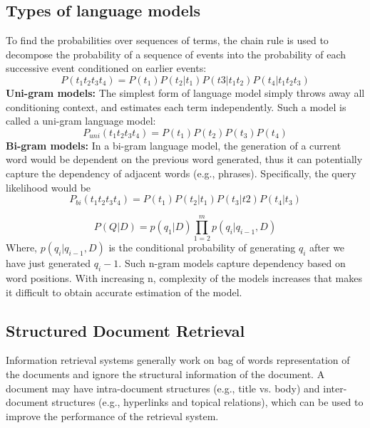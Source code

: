 \documentclass[draftcls, onecolumn, 11pt]{IEEEtran}
\begin{document}
\subsection{Types of language models}
To find the probabilities over sequences of terms, the chain rule is used to decompose the probability of a sequence of events into the probability of each successive event conditioned on earlier events:
\begin{equation}
P(t_1 t_2 t_3 t_4)=P(t_1) P(t_2|t_1) P(t3|t_1 t_2) P(t_4|t_1 t_2 t_3)
\end{equation}
\vspace{8pt}
\textbf{Uni-gram models:} The simplest form of language model simply throws away all conditioning context, and estimates each term independently. Such a model is called a uni-gram language model:
\begin{equation}
P_{uni}(t_1 t_2t_3t_4)=P(t_1) P(t_2)P(t_3)P(t_4)
\end{equation}
\vspace{8pt}
\textbf{Bi-gram models:} In a bi-gram language model, the generation of a current word would be dependent on the previous word generated, thus it can potentially capture the dependency of adjacent words (e.g., phrases). Specifically, the query likelihood would be
\begin{equation}
P_{bi}(t_1 t_2t_3t_4)=P(t_1) P(t_2|t_1)P(t_3|t2)P(t_4|t_3)
\end{equation}

\begin{equation}
P(Q|D)=p(q_1|D)\prod_{1=2}^{m}p(q_i|q_{i-1},D)
\end{equation}
\noindent Where, $p(q_i|q_{i-1},D)$ is the conditional probability of generating $q_i$ after we have just generated $q_i-1$.
Such n-gram models capture dependency based on word positions. With increasing n, complexity of the models increases that makes it difficult to obtain accurate estimation of the model.

\subsection{Structured Document Retrieval}
Information retrieval systems generally work on bag of words representation of the documents and ignore the structural information of the document. A document may have intra-document structures (e.g., title vs. body) and inter-document structures (e.g., hyperlinks and topical relations), which can be used to improve the performance of the retrieval system.
\end{document}
